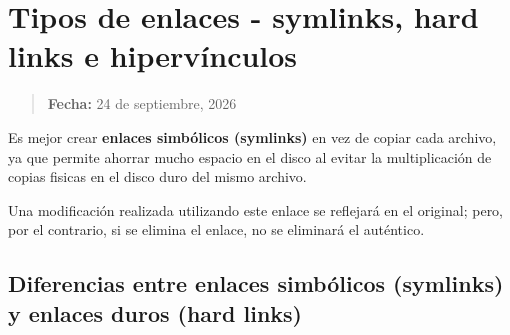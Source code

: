 \documentclass[
  spanish,
  12pt,
  letterpaper,
  DIV=11,
  numbers=noendperiod]{scrreprt}
\begin{document}
\chapter{Tipos de enlaces - symlinks, hard links e
hipervínculos}\label{tipos-de-enlaces---symlinks-hard-links-e-hipervuxednculos}

\begin{quote}
\textbf{Fecha:} 24 de septiembre, 2026
\end{quote}

Es mejor crear \textbf{enlaces simbólicos (symlinks)} en vez de copiar
cada archivo, ya que permite ahorrar mucho espacio en el disco al evitar
la multiplicación de copias fisicas en el disco duro del mismo archivo.

Una modificación realizada utilizando este enlace se reflejará en el
original; pero, por el contrario, si se elimina el enlace, no se
eliminará el auténtico.

\section{Diferencias entre enlaces simbólicos (symlinks) y enlaces duros
(hard
links)}\label{diferencias-entre-enlaces-simbuxf3licos-symlinks-y-enlaces-duros-hard-links}
\end{document}
